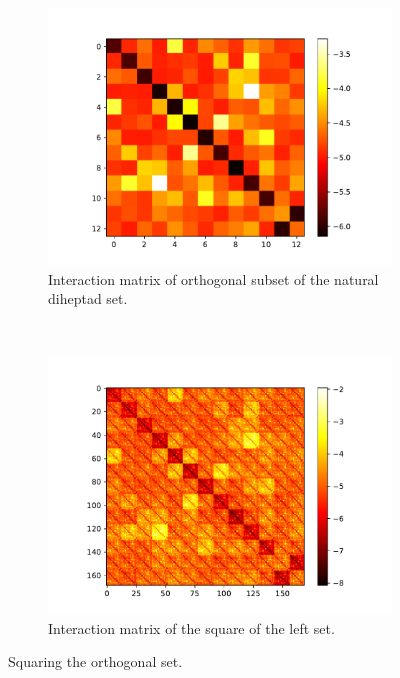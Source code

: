 \documentclass[12pt,a4paper,titlepage,openany]{report}
\begin{document}
\begin{figure}[h]
	\centering
	\begin{subfigure}{0.48\linewidth}
		\includegraphics[width=\linewidth]{interaction_matrix_natural_diheptad_orthoset.pdf}
		\caption{Interaction matrix of orthogonal subset of the natural diheptad set.}
		\label{subfig:Interaction matrix of the natural diheptad set}
	\end{subfigure}
	~
	\begin{subfigure}{0.48\linewidth}
		\includegraphics[width=\linewidth]{interaction_matrix_squared_natural_diheptad_orthoset.pdf}
		\caption{Interaction matrix of the square of the left set.}
		\label{subfig:Interaction matrix of the squared natural diheptad set}
	\end{subfigure}
	\caption{Squaring the orthogonal set.}
	\label{fig:Squaring the orthogonal set}
\end{figure}
\end{document}
